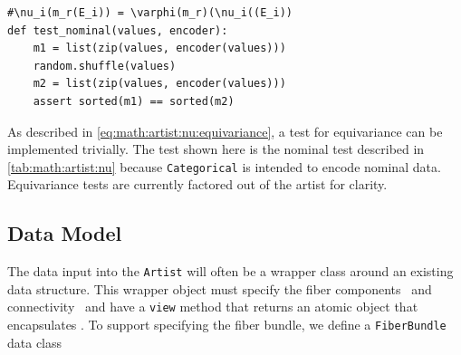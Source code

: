 \documentclass[../main.tex]{subfiles}
\begin{document}
\begin{verbatim}
#\nu_i(m_r(E_i)) = \varphi(m_r)(\nu_i((E_i))
def test_nominal(values, encoder):
    m1 = list(zip(values, encoder(values)))
    random.shuffle(values)
    m2 = list(zip(values, encoder(values)))
    assert sorted(m1) == sorted(m2)
\end{verbatim}
As described in \autoref{eq:math:artist:nu:equivariance}, a test for equivariance can be implemented trivially. The test shown here is the nominal test described in \autoref{tab:math:artist:nu} because \texttt{Categorical} is intended to encode nominal data. Equivariance tests are currently factored out of the artist for clarity. 

\subsection{Data Model}
\label{sec:code:data}
The data input into the \texttt{Artist} will often be a wrapper class around an existing data structure. This wrapper object must specify the fiber components \dfiber\ and connectivity \dbase\ and have a \texttt{view} method that returns an atomic object that encapsulates \dsection. To support specifying the fiber bundle, we define a \texttt{FiberBundle} data class \cite{DataClasses}
\end{document}
